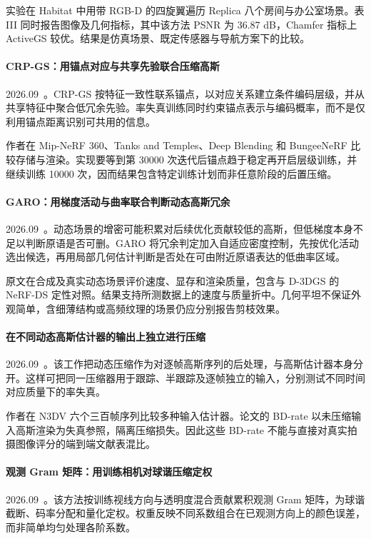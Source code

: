 实验在 Habitat 中用带 RGB-D 的四旋翼遍历 Replica 八个房间与办公室场景。表 III 同时报告图像及几何指标，其中该方法 PSNR 为 36.87 dB，Chamfer 指标上 ActiveGS 较优。结果是仿真场景、既定传感器与导航方案下的比较。

\paragraph{CRP-GS：用锚点对应与共享先验联合压缩高斯}
2026.09~\cite{2609_23005}。CRP-GS 按特征一致性联系锚点，以对应关系建立条件编码层级，并从共享特征中聚合低冗余先验。率失真训练同时约束锚点表示与编码概率，而不是仅利用锚点距离识别可共用的信息。

作者在 Mip-NeRF 360、Tanks and Temples、Deep Blending 和 BungeeNeRF 比较存储与渲染。实现要等到第 30000 次迭代后锚点趋于稳定再开启层级训练，并继续训练 10000 次，因而结果包含特定训练计划而非任意阶段的后置压缩。

\paragraph{GARO：用梯度活动与曲率联合判断动态高斯冗余}
2026.09~\cite{2609_23509}。动态场景的增密可能积累对后续优化贡献较低的高斯，但低梯度本身不足以判断原语是否可删。GARO 将冗余判定加入自适应密度控制，先按优化活动选出候选，再用局部几何估计判断是否处在可由附近原语表达的低曲率区域。

原文在合成及真实动态场景评价速度、显存和渲染质量，包含与 D-3DGS 的 NeRF-DS 定性对照。结果支持所测数据上的速度与质量折中。几何平坦不保证外观简单，含细薄结构或高频纹理的场景仍应分别报告剪枝效果。

\paragraph{在不同动态高斯估计器的输出上独立进行压缩}
2026.09~\cite{2609_25633}。该工作把动态压缩作为对逐帧高斯序列的后处理，与高斯估计器本身分开。这样可把同一压缩器用于跟踪、半跟踪及逐帧独立的输入，分别测试不同时间对应质量下的率失真。

作者在 N3DV 六个三百帧序列比较多种输入估计器。论文的 BD-rate 以未压缩输入高斯渲染为失真参照，隔离压缩损失。因此这些 BD-rate 不能与直接对真实拍摄图像评分的端到端文献表混比。

\paragraph{观测 Gram 矩阵：用训练相机对球谐压缩定权}
2026.09~\cite{2609_28997}。该方法按训练视线方向与透明度混合贡献累积观测 Gram 矩阵，为球谐截断、码率分配和量化定权。权重反映不同系数组合在已观测方向上的颜色误差，而非简单均匀处理各阶系数。

